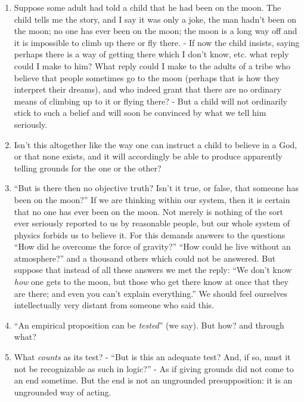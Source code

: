 \documentclass{book}
\begin{document}
\begin{enumerate}
\item
Suppose some adult had told a child that he had been on the moon. The child
tells me the story, and I say it was only a joke, the man hadn't been on the
moon; no one has ever been on the moon; the moon is a long way off and it is
impossible to climb up there or fly there. - If now the child insists, saying
perhaps there is a way of getting there which I don't know, etc. what reply
could I make to him? What reply could I make to the adults of a tribe who
believe that people sometimes go to the moon (perhaps that is how they
interpret their dreams), and who indeed grant that there are no ordinary means
of climbing up to it or flying there? - But a child will not ordinarily stick
to such a belief and will soon be convinced by what we tell him seriously.

\item
Isn't this altogether like the way one can instruct a child to believe in a
God, or that none exists, and it will accordingly be able to produce apparently
telling grounds for the one or the other?

\item
``But is there then no objective truth? Isn't it true, or false, that someone
has been on the moon?'' If we are thinking within our system, then it is
certain that no one has ever been on the moon. Not merely is nothing of the
sort ever seriously reported to us by reasonable people, but our whole system
of physics forbids us to believe it. For this demands answers to the questions
``How did he overcome the force of gravity?'' ``How could he live without an
atmosphere?'' and a thousand others which could not be answered. But suppose
that instead of all these answers we met the reply: ``We don't know \emph{how}
one gets to the moon, but those who get there know at once that they are there;
and even you can't explain everything.'' We should feel ourselves
intellectually very distant from someone who said this.

\item
``An empirical proposition can be \emph{tested}'' (we say). But how? and
through what?

\item
What \emph{counts} as its test? - ``But is this an adequate test? And, if so,
must it not be recognizable as such in logic?'' - As if giving grounds did not
come to an end sometime. But the end is not an ungrounded presupposition: it is
an ungrounded way of acting.


\end{enumerate}
\end{document}
